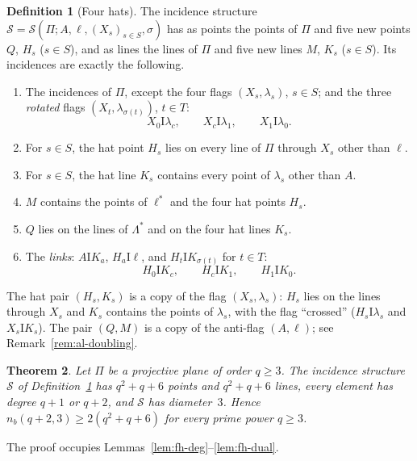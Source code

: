 \documentclass[11pt]{amsart}
\newtheorem{theorem}{Theorem}[section]
\theoremstyle{definition}
\newtheorem{definition}[theorem]{Definition}
\theoremstyle{remark}
\newcommand{\cS}{\mathcal{S}}
\newcommand{\I}{\mathrel{\mathrm{I}}}
\newcommand{\lam}{\lambda}
\begin{document}
\begin{definition}[Four hats]\label{def:fourhat}
The incidence structure $\cS=\cS(\Pi;A,\ell,(X_s)_{s\in S},\sigma)$ has as points the points of $\Pi$ and five new points $Q$, $H_s$ ($s\in S$), and as lines the lines of $\Pi$ and five new lines $M$, $K_s$ ($s\in S$). Its incidences are exactly the following.
\begin{enumerate}[label=\textup{(H\arabic*)},ref=\textup{H\arabic*},leftmargin=3em]
\item\label{h:plane} The incidences of $\Pi$, except the four flags $(X_s,\lam_s)$, $s\in S$; and the three \emph{rotated} flags $(X_t,\lam_{\sigma(t)})$, $t\in T$:
\[
X_0\I\lam_c,\qquad X_c\I\lam_1,\qquad X_1\I\lam_0.
\]
\item\label{h:hat} For $s\in S$, the hat point $H_s$ lies on every line of $\Pi$ through $X_s$ other than $\ell$.
\item\label{h:hatline} For $s\in S$, the hat line $K_s$ contains every point of $\lam_s$ other than $A$.
\item\label{h:M} $M$ contains the points of $\ell^*$ and the four hat points $H_s$.
\item\label{h:Q} $Q$ lies on the lines of $\Lambda^*$ and on the four hat lines $K_s$.
\item\label{h:links} The \emph{links}: $A\I K_a$, $H_a\I\ell$, and $H_t\I K_{\sigma(t)}$ for $t\in T$:
\[
H_0\I K_c,\qquad H_c\I K_1,\qquad H_1\I K_0.
\]
\end{enumerate}
\end{definition}

The hat pair $(H_s,K_s)$ is a copy of the flag $(X_s,\lam_s)$: $H_s$ lies on the lines through $X_s$ and $K_s$ contains the points of $\lam_s$, with the flag ``crossed'' ($H_s\I\lam_s$ and $X_s\I K_s$). The pair $(Q,M)$ is a copy of the anti-flag $(A,\ell)$; see Remark~\ref{rem:al-doubling}.

\begin{theorem}\label{thm:fourhat}
Let $\Pi$ be a projective plane of order $q\ge3$. The incidence structure $\cS$ of Definition~\ref{def:fourhat} has $q^2+q+6$ points and $q^2+q+6$ lines, every element has degree $q+1$ or $q+2$, and $\cS$ has diameter~$3$. Hence $n_b(q+2,3)\ge2(q^2+q+6)$ for every prime power $q\ge3$.
\end{theorem}

The proof occupies Lemmas~\ref{lem:fh-deg}--\ref{lem:fh-dual}.
\end{document}
